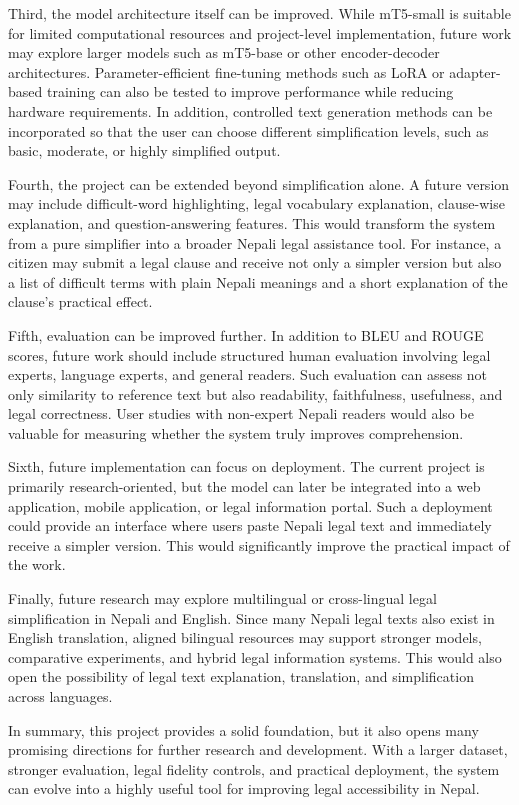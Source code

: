 \documentclass[12pt]{report}
\begin{document}
Third, the model architecture itself can be improved. While mT5-small is suitable for limited computational resources and project-level implementation, future work may explore larger models such as mT5-base or other encoder-decoder architectures. Parameter-efficient fine-tuning methods such as LoRA or adapter-based training can also be tested to improve performance while reducing hardware requirements. In addition, controlled text generation methods can be incorporated so that the user can choose different simplification levels, such as basic, moderate, or highly simplified output.

Fourth, the project can be extended beyond simplification alone. A future version may include difficult-word highlighting, legal vocabulary explanation, clause-wise explanation, and question-answering features. This would transform the system from a pure simplifier into a broader Nepali legal assistance tool. For instance, a citizen may submit a legal clause and receive not only a simpler version but also a list of difficult terms with plain Nepali meanings and a short explanation of the clause’s practical effect.

Fifth, evaluation can be improved further. In addition to BLEU and ROUGE scores, future work should include structured human evaluation involving legal experts, language experts, and general readers. Such evaluation can assess not only similarity to reference text but also readability, faithfulness, usefulness, and legal correctness. User studies with non-expert Nepali readers would also be valuable for measuring whether the system truly improves comprehension.

Sixth, future implementation can focus on deployment. The current project is primarily research-oriented, but the model can later be integrated into a web application, mobile application, or legal information portal. Such a deployment could provide an interface where users paste Nepali legal text and immediately receive a simpler version. This would significantly improve the practical impact of the work.

Finally, future research may explore multilingual or cross-lingual legal simplification in Nepali and English. Since many Nepali legal texts also exist in English translation, aligned bilingual resources may support stronger models, comparative experiments, and hybrid legal information systems. This would also open the possibility of legal text explanation, translation, and simplification across languages.

In summary, this project provides a solid foundation, but it also opens many promising directions for further research and development. With a larger dataset, stronger evaluation, legal fidelity controls, and practical deployment, the system can evolve into a highly useful tool for improving legal accessibility in Nepal.
\end{document}
